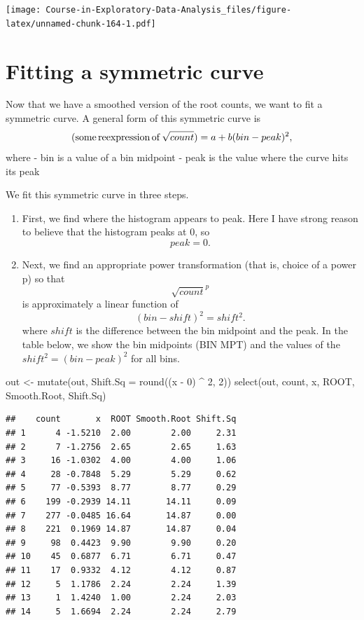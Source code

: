 \documentclass[
]{book}
\newenvironment{Shaded}{\begin{snugshade}}{\end{snugshade}}
\newcommand{\AttributeTok}[1]{\textcolor[rgb]{0.77,0.63,0.00}{#1}}
\newcommand{\DecValTok}[1]{\textcolor[rgb]{0.00,0.00,0.81}{#1}}
\newcommand{\FunctionTok}[1]{\textcolor[rgb]{0.00,0.00,0.00}{#1}}
\newcommand{\NormalTok}[1]{#1}
\newcommand{\OtherTok}[1]{\textcolor[rgb]{0.56,0.35,0.01}{#1}}
\newcommand{\SpecialCharTok}[1]{\textcolor[rgb]{0.00,0.00,0.00}{#1}}
\providecommand{\tightlist}{%
  \setlength{\itemsep}{0pt}\setlength{\parskip}{0pt}}
\begin{document}
\texttt{[image: Course-in-Exploratory-Data-Analysis\_files/figure-latex/unnamed-chunk-164-1.pdf]}

\hypertarget{fitting-a-symmetric-curve}{%
\section{Fitting a symmetric curve}\label{fitting-a-symmetric-curve}}

Now that we have a smoothed version of the root counts, we want to fit a symmetric curve. A general form of this symmetric curve is
\[
({\rm some \, reexpression \, of } \, \sqrt{count}) =
a + b (bin - peak) ^ 2,
\]
where
- bin is a value of a bin midpoint
- peak is the value where the curve hits its peak

We fit this symmetric curve in three steps.

\begin{enumerate}
\def\labelenumi{\arabic{enumi}.}
\tightlist
\item
  First, we find where the histogram appears to peak. Here I have strong reason to believe that the histogram peaks at 0, so
  \[
  peak = 0.
  \]
\item
  Next, we find an appropriate power transformation (that is, choice of a power p) so that
  \[
  {\sqrt{count}} ^ p
  \]
  is approximately a linear function of
  \[
  (bin - shift)^2 = shift ^ 2.
  \]
  where \(shift\) is the difference between the bin midpoint and the peak. In the table below, we show the bin midpoints (BIN MPT) and the values of the \(shift^2 = (bin - peak)^2\) for all bins.
\end{enumerate}

\begin{Shaded}
\begin{Highlighting}[]
\NormalTok{out }\OtherTok{\textless{}{-}} \FunctionTok{mutate}\NormalTok{(out, }\AttributeTok{Shift.Sq =} \FunctionTok{round}\NormalTok{((x }\SpecialCharTok{{-}} \DecValTok{0}\NormalTok{) }\SpecialCharTok{\^{}} \DecValTok{2}\NormalTok{, }\DecValTok{2}\NormalTok{))}
\FunctionTok{select}\NormalTok{(out, count, x, ROOT, Smooth.Root, Shift.Sq)}
\end{Highlighting}
\end{Shaded}

\begin{verbatim}
##    count       x  ROOT Smooth.Root Shift.Sq
## 1      4 -1.5210  2.00        2.00     2.31
## 2      7 -1.2756  2.65        2.65     1.63
## 3     16 -1.0302  4.00        4.00     1.06
## 4     28 -0.7848  5.29        5.29     0.62
## 5     77 -0.5393  8.77        8.77     0.29
## 6    199 -0.2939 14.11       14.11     0.09
## 7    277 -0.0485 16.64       14.87     0.00
## 8    221  0.1969 14.87       14.87     0.04
## 9     98  0.4423  9.90        9.90     0.20
## 10    45  0.6877  6.71        6.71     0.47
## 11    17  0.9332  4.12        4.12     0.87
## 12     5  1.1786  2.24        2.24     1.39
## 13     1  1.4240  1.00        2.24     2.03
## 14     5  1.6694  2.24        2.24     2.79
\end{verbatim}
\end{document}
